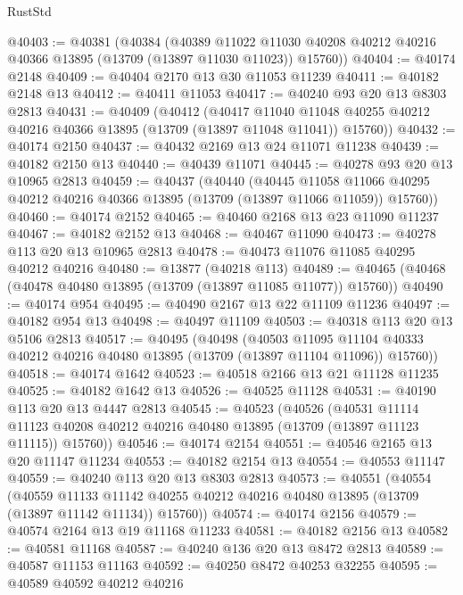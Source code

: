 \begin{lexlean}{RustStd}
\begin{coremodule}
@40403 := @40381
    (@40384
      (@40389
        @11022
        @11030
        @40208
        @40212
        @40216
        @40366
        @13895
        (@13709 (@13897 @11030 @11023))
        @15760))
@40404 := @40174 @2148
@40409 := @40404 @2170 @13 @30 @11053 @11239
@40411 := @40182 @2148 @13
@40412 := @40411 @11053
@40417 := @40240 @93 @20 @13 @8303 @2813
@40431 := @40409
    (@40412
      (@40417
        @11040
        @11048
        @40255
        @40212
        @40216
        @40366
        @13895
        (@13709 (@13897 @11048 @11041))
        @15760))
@40432 := @40174 @2150
@40437 := @40432 @2169 @13 @24 @11071 @11238
@40439 := @40182 @2150 @13
@40440 := @40439 @11071
@40445 := @40278 @93 @20 @13 @10965 @2813
@40459 := @40437
    (@40440
      (@40445
        @11058
        @11066
        @40295
        @40212
        @40216
        @40366
        @13895
        (@13709 (@13897 @11066 @11059))
        @15760))
@40460 := @40174 @2152
@40465 := @40460 @2168 @13 @23 @11090 @11237
@40467 := @40182 @2152 @13
@40468 := @40467 @11090
@40473 := @40278 @113 @20 @13 @10965 @2813
@40478 := @40473 @11076 @11085 @40295 @40212 @40216
@40480 := @13877 (@40218 @113)
@40489 := @40465 (@40468 (@40478 @40480 @13895 (@13709 (@13897 @11085 @11077)) @15760))
@40490 := @40174 @954
@40495 := @40490 @2167 @13 @22 @11109 @11236
@40497 := @40182 @954 @13
@40498 := @40497 @11109
@40503 := @40318 @113 @20 @13 @5106 @2813
@40517 := @40495
    (@40498
      (@40503
        @11095
        @11104
        @40333
        @40212
        @40216
        @40480
        @13895
        (@13709 (@13897 @11104 @11096))
        @15760))
@40518 := @40174 @1642
@40523 := @40518 @2166 @13 @21 @11128 @11235
@40525 := @40182 @1642 @13
@40526 := @40525 @11128
@40531 := @40190 @113 @20 @13 @4447 @2813
@40545 := @40523
    (@40526
      (@40531
        @11114
        @11123
        @40208
        @40212
        @40216
        @40480
        @13895
        (@13709 (@13897 @11123 @11115))
        @15760))
@40546 := @40174 @2154
@40551 := @40546 @2165 @13 @20 @11147 @11234
@40553 := @40182 @2154 @13
@40554 := @40553 @11147
@40559 := @40240 @113 @20 @13 @8303 @2813
@40573 := @40551
    (@40554
      (@40559
        @11133
        @11142
        @40255
        @40212
        @40216
        @40480
        @13895
        (@13709 (@13897 @11142 @11134))
        @15760))
@40574 := @40174 @2156
@40579 := @40574 @2164 @13 @19 @11168 @11233
@40581 := @40182 @2156 @13
@40582 := @40581 @11168
@40587 := @40240 @136 @20 @13 @8472 @2813
@40589 := @40587 @11153 @11163
@40592 := @40250 @8472 @40253 @32255
@40595 := @40589 @40592 @40212 @40216

\end{coremodule}
\end{lexlean}
